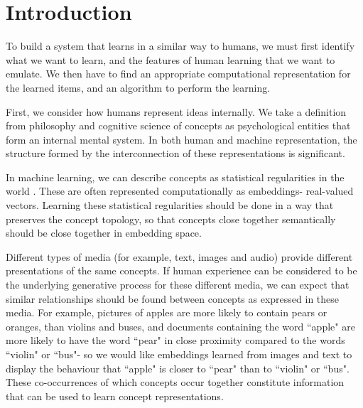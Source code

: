 \chapter{Introduction}

To build a system that learns in a similar way to humans, we must first identify what we want to learn, and the features of human learning that we want to emulate. We then have to find an appropriate computational representation for the learned items, and an algorithm to perform the learning. 

First, we consider how humans represent ideas internally. We take a definition from philosophy \cite{stanfordconcepts}  and cognitive science  \cite{Pinker2007} of concepts as psychological entities that form an internal mental system. In both human and machine representation, the structure formed by the interconnection of these representations is significant. 


In machine learning, we can describe concepts as statistical regularities in the world \cite{RoadsLoveNatureMachineIntelligence}. These are often represented computationally as embeddings- real-valued vectors. Learning these statistical regularities should be done in a way that preserves the concept topology, so that concepts close together semantically should be close together in embedding space. 

Different types of media (for example, text, images and audio) provide different presentations of the same concepts. If human experience can be considered to be the underlying generative process for these different media, we can expect that similar relationships should be found between concepts as expressed in these media. For example, pictures of apples are more likely to contain pears or oranges, than violins and buses, and documents containing the word ``apple" are more likely to have the word ``pear" in close proximity compared to the words ``violin" or ``bus"- so we would like embeddings learned from images and text to display the behaviour that ``apple" is closer to ``pear" than to ``violin" or ``bus". These co-occurrences of which concepts occur together constitute information that can be used to learn concept representations. 

